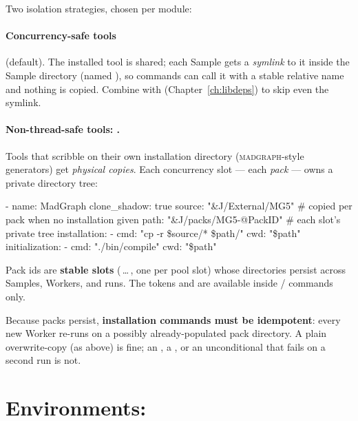 Two isolation strategies, chosen per module:

\paragraph{Concurrency-safe tools} (default). The installed tool is shared; each Sample
gets a \emph{symlink} to it inside the Sample directory (named ),
so commands can call it with a stable relative name and nothing is copied. Combine with
 (Chapter~\ref{ch:libdeps}) to skip even the
symlink.

\paragraph{Non-thread-safe tools: .} Tools that scribble on
their own installation directory (\textsc{madgraph}-style generators) get \emph{physical
copies}. Each concurrency slot --- each \emph{pack} --- owns a private directory tree:

\begin{yamlwin}
- name: MadGraph
  clone_shadow: true
  source: "&J/External/MG5"          # copied per pack when no installation given
  path: "&J/packs/MG5-@PackID"       # each slot's private tree
  installation:
    - cmd: "cp -r \${source}/* \${path}/"
      cwd: "\${path}"
  initialization:
    - cmd: "./bin/compile"
      cwd: "\${path}"
\end{yamlwin}

Pack ids are \textbf{stable slots} (\,\ldots\,, one per pool slot)
whose directories persist across Samples, Workers, and runs. The tokens
 and  are available inside
 /  commands only.

\begin{jwarn}
Because packs persist, \textbf{installation commands must be idempotent}: every new
Worker re-runs  on a possibly already-populated pack directory. A
plain overwrite-copy (as above) is fine; an , a , or an
unconditional  that fails on a second run is not.
\end{jwarn}

\section{Environments: }
\label{sec:env-setup}

